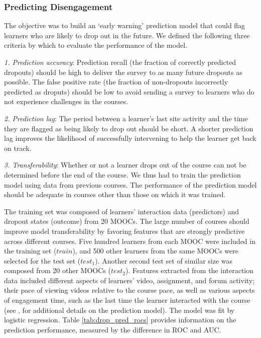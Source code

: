 \documentclass{sigchi}\usepackage[]{graphicx}\usepackage[]{color}
\begin{document}
\subsubsection{Predicting Disengagement}

The objective was to build an `early warning' prediction model that could flag learners who are likely to drop out in the future. We defined the following three criteria by which to evaluate the performance of the model.

\textit{1. Prediction accuracy}: Prediction recall (the fraction of correctly predicted dropouts) should be high to deliver the survey to as many future dropouts as possible. The false positive rate (the fraction of non-dropouts incorrectly predicted as droputs) should be low to avoid sending a survey to learners who do not experience challenges in the courses.

\textit{2. Prediction lag}: The period between a learner's last site activity and the time they are flagged as being likely to drop out should be short. A shorter prediction lag improves the likelihood of successfully intervening to help the learner get back on track.

\textit{3. Transferability}: Whether or not a learner drops out of the course can not be determined before the end of the course. We thus had to train the prediction model using data from previous courses. The performance of the prediction model should be adequate in courses other than those on which it was trained.

The training set was composed of learners' interaction data (predictors) and dropout states (outcome) from 20 MOOCs. The large number of courses should improve model transferability by favoring features that are strongly predictive across different courses. Five hundred learners from each MOOC were included in the training set ($train$), and 500 other learners from the same MOOCs were selected for the test set ($test_1$). Another second test set of similar size was composed from 20 other MOOCs ($test_2$). Features extracted from the interaction data included different aspects of learners' video, assignment, and forum activity; their pace of viewing videos relative to the course pace, as well as various aspects of engagement time, such as the last time the learner interacted with the course (see \cite{halawa2014dropout}, for additional details on the prediction model). The model was fit by logistic regression. Table \ref{tab:drop_pred_rocs} provides information on the prediction performance, measured by the difference in ROC and AUC.
\end{document}

